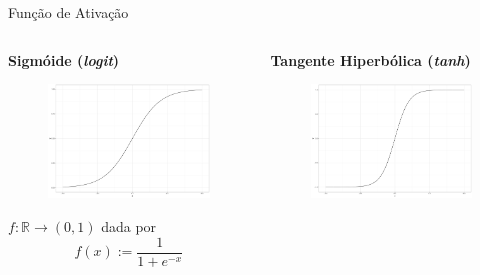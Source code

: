 \documentclass{beamer}
\newcommand{\R}{\mathds{R}}
\begin{document}
    \begin{frame}{Função de Ativação}
        \begin{columns}[onlytextwidth,t]
            \begin{column}{0.48\textwidth}
                \centering
                \textbf{Sigmóide (\textit{logit})}
                
                \begin{figure}
                    \includegraphics[scale=0.12]{figuras/sigmoid.pdf}
	            \end{figure}
	               
	            $f: \R \rightarrow (0,1)$ dada por 
	            \[f(x) := \frac{1}{1 + e^{-x}}\]
	            
            \end{column}

            \begin{column}{0.48\textwidth}
                \centering
                \textbf{Tangente Hiperbólica (\textit{tanh})}
            
                \begin{figure}
                     \includegraphics[scale=0.12]{figuras/tanh.pdf}
	            \end{figure}
	            

\end{column}
\end{columns}
\end{frame}
\end{document}
